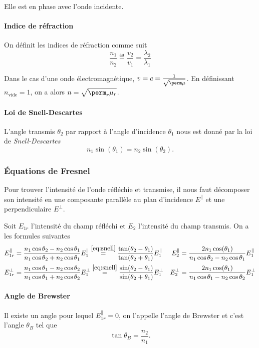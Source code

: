 Elle est en phase avec l'onde incidente.

\paragraph{Indice de réfraction}
On définit les indices de réfraction comme suit
\[ \frac{n_1}{n_2} \eqdef \frac{v_2}{v_1} = \frac{\lambda_2}{\lambda_1} \]

Dans le cas d'une onde électromagnétique,
$v = c = \frac{1}{\sqrt{\perm\mu}}$.
En définissant $n_\mathrm{vide} = 1$,
on a alors
$n = \sqrt{\perm_r\mu_r}$.

\paragraph{Loi de Snell-Descartes}
L'angle transmis $\theta_2$ par rapport à l'angle d'incidence
$\theta_1$ nous est donné par la loi de \emph{Snell-Descartes}
\begin{equation}
  \label{eq:snell}
  n_1 \sin(\theta_1) = n_2 \sin(\theta_2).
\end{equation}

\subsubsection{Équations de Fresnel}
Pour trouver l'intensité de l'onde réfléchie et transmise, il nous
faut décomposer son intensité en une composante parallèle au plan d'incidence
$E^\parallel$ et une perpendiculaire $E^\perp$.

Soit $E_{1r}$ l'intensité du champ réfléchi
et $E_{2}$ l'intensité du champ transmis.
On a les formules suivantes
\begin{align*}
  E_{1r}^\parallel & = \frac{n_1\cos\theta_2 - n_2\cos\theta_1}
  {n_1\cos\theta_2 + n_2\cos\theta_1}E_{1}^\parallel
  \stackrel{\eqref{eq:snell}}{=}
  \frac{\tan(\theta_2 - \theta_1)}{\tan(\theta_2 + \theta_1)}E_1^\parallel
  & E_2^\parallel & = \frac{2n_1\cos(\theta_1)}
  {n_1\cos\theta_2 - n_2\cos\theta_1}E_{1}^\parallel\\
  E_{1r}^\perp & = \frac{n_1\cos\theta_1 - n_2\cos\theta_2}
  {n_1\cos\theta_1 + n_2\cos\theta_2}E_{1}^\perp
  \stackrel{\eqref{eq:snell}}{=}
  \frac{\sin(\theta_2 - \theta_1)}{\sin(\theta_2 + \theta_1)}E_1^\perp
  & E_2^\perp & = \frac{2n_1\cos(\theta_1)}
  {n_1\cos\theta_1 - n_2\cos\theta_2}E_{1}^\perp\\
\end{align*}

\paragraph{Angle de Brewster}
Il existe un angle pour lequel $E_{1r}^\parallel = 0$,
on l'appelle l'angle de Brewster et c'est l'angle $\theta_B$ tel que
\[ \tan\theta_B = \frac{n_2}{n_1}. \]

